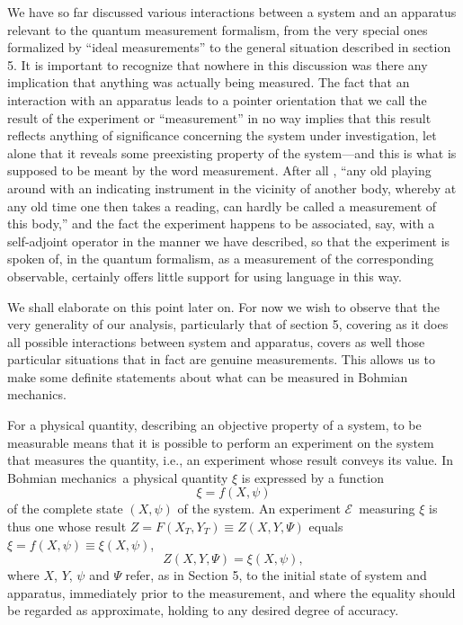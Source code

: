 \documentclass[12pt]{article}
\newcommand{\BM}{Bohmian mechanics}
\newcommand{\E}{\mbox{$\mathscr{E}$}}
\begin{document}
We have so far discussed various interactions between a system and an
apparatus relevant to the quantum measurement formalism, {}from the
very special ones formalized by ``ideal measurements'' to the general
situation described in section 5. It is important to recognize that
nowhere in this discussion was there any implication that anything was
actually being measured. The fact that an interaction with an
apparatus leads to a pointer orientation that we call the result of
the experiment or ``measurement'' in no way implies that this result
reflects anything of significance concerning the system under
investigation, let alone that it reveals some preexisting property of
the system---and this is what is supposed to be meant by the word
measurement. After all \cite{Sch35}, ``any old playing around with an
indicating instrument in the vicinity of another body, whereby at any
old time one then takes a reading, can hardly be called a measurement
of this body,'' and the fact the experiment happens to be associated,
say, with a self-adjoint operator in the manner we have described, so
that the experiment is spoken of, in the quantum formalism, as a
measurement of the corresponding observable, certainly offers little
support for using language in this way.

We shall elaborate on this point later on. For now we wish to observe
that the very generality of our analysis, particularly that of section
5, covering as it does all possible interactions between system and
apparatus, covers as well those particular situations that in fact are
genuine measurements. This allows us to make some definite statements
about what can be measured in Bohmian mechanics.

For a physical quantity, describing an objective property of a system,
to be measurable means that it is possible to perform an experiment on
the system that measures the quantity, i.e., an experiment whose
result conveys its value.  In \BM\ a physical quantity $\xi$ is
expressed by a function
\begin{equation} {\xi}= f (X, \psi) \label{pq}
\end{equation}
of the complete state $(X, \psi)$ of the system.  An experiment \E\
measuring $\xi$ is thus one whose result ${Z}=F(X_T,Y_T)\equiv
{Z}(X,Y,\Psi)$ equals $\xi=f(X,\psi)\equiv {\xi}(X,\psi)$,
\begin{equation}
{Z}(X,Y,\Psi)={\xi}(X,\psi),\label{xz}
\end{equation}
where $X$, $Y$, $\psi$ and $\Psi$ refer, as in Section 5, to the
initial state of system and apparatus, immediately prior to the
measurement, and where the equality should be regarded as approximate,
holding to any desired degree of accuracy.
\end{document}
